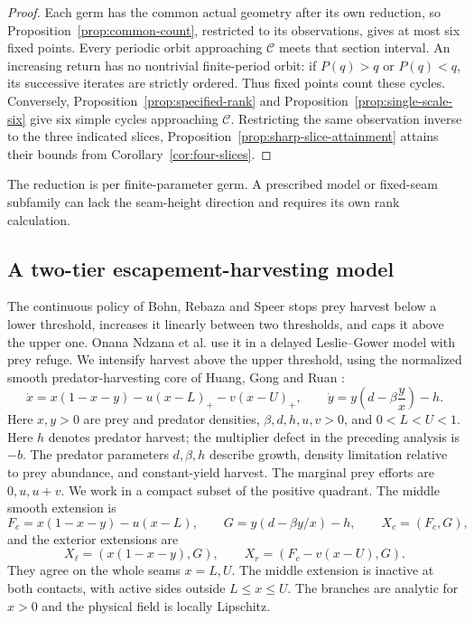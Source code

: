 \begin{proof}
Each germ has the common actual geometry after its own reduction,
so Proposition~\ref{prop:common-count}, restricted to its observations,
gives at most six fixed points.
Every periodic orbit approaching \(\mathcal C\) meets that section
interval. An increasing return has no nontrivial finite-period orbit:
if \(P(q)>q\) or \(P(q)<q\), its successive iterates are strictly
ordered. Thus fixed points count these cycles. Conversely,
Proposition~\ref{prop:specified-rank} and
Proposition~\ref{prop:single-scale-six} give six simple cycles
approaching \(\mathcal C\).
Restricting the same observation inverse to the three indicated slices,
Proposition~\ref{prop:sharp-slice-attainment} attains their bounds from
Corollary~\ref{cor:four-slices}.
\end{proof}
The reduction is per finite-parameter germ. A prescribed model or
fixed-seam subfamily can lack the seam-height direction and requires
its own rank calculation.

\subsection{A two-tier escapement-harvesting model}
\label{sec:harvesting}

The continuous policy of Bohn, Rebaza and Speer
\cite[Model~Two, equation~(17)]{bohn2011} stops prey harvest below
a lower threshold, increases it linearly between two thresholds,
and caps it above the upper one. Onana Ndzana et al.
\cite[equations~(5)--(6)]{onana2019} use it in a delayed
Leslie--Gower model with prey refuge. We intensify harvest above
the upper threshold, using the normalized smooth
predator-harvesting core of Huang, Gong and Ruan
\cite[equation~(9) and Theorem~3.6]{huang2013}:
\begin{equation}\label{eq:harvesting:model}
 \dot x=x(1-x-y)-u(x-L)_+-v(x-U)_+,\qquad
 \dot y=y\left(d-\beta\frac yx\right)-h.
\end{equation}
Here \(x,y>0\) are prey and predator densities,
\(\beta,d,h,u,v>0\), and \(0<L<U<1\).
Here \(h\) denotes predator harvest; the multiplier defect in the
preceding analysis is \(-b\). The predator parameters \(d,\beta,h\) describe growth, density
limitation relative to prey abundance, and constant-yield harvest.
The marginal prey efforts are \(0,u,u+v\). We work in a compact
subset of the positive quadrant. The middle smooth extension is
\begin{equation}\label{eq:harvesting:middle}
 F_c=x(1-x-y)-u(x-L),\qquad
 G=y(d-\beta y/x)-h,\qquad X_c=(F_c,G),
\end{equation}
and the exterior extensions are
\[
 X_\ell=(x(1-x-y),G),\qquad X_r=(F_c-v(x-U),G).
\]
They agree on the whole seams \(x=L,U\). The middle extension is
inactive at both contacts, with active sides outside \(L\le x\le U\).
The branches are analytic for \(x>0\) and the physical field is
locally Lipschitz.

